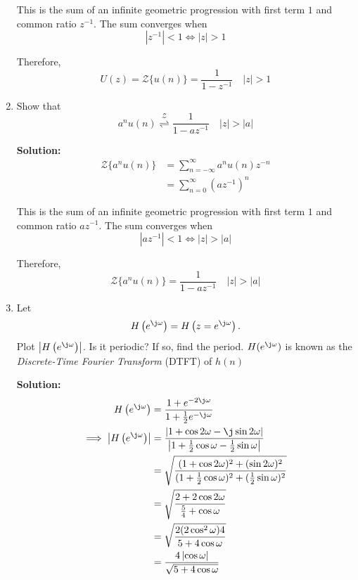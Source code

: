 \documentclass[journal,12pt,twocolumn]{IEEEtran}
\newcommand{\solution}{\noindent \textbf{Solution: }}
\providecommand{\brak}[1]{\ensuremath{\left(#1\right)}}
\providecommand{\abs}[1]{\left\vert#1\right\vert}
\providecommand{\z}[1]{{\mathcal{Z}}\{#1\}}
\providecommand{\ztrans}{\overset{\mathcal{Z}}{ \rightleftharpoons}}
\numberwithin{equation}{section}
\renewcommand\thesection{\arabic{section}}
\begin{document}
\begin{enumerate}[label=\thesection.\arabic*]
	This is the sum of an infinite geometric progression with first term $1$ and common ratio $z^{-1}$. The sum converges when
	\begin{equation}
		\abs{z^{-1}} < 1 \iff \abs{z} > 1
	\end{equation}
	
	Therefore,
	\begin{equation}
		U(z) = \z{u(n)} = \frac{1}{1 - z^{-1}} \quad \abs{z} > 1
	\end{equation}

	\item Show that 
	\begin{equation}
		\label{eq:anun}
		a^nu(n) \ztrans \frac{1}{1-az^{-1}} \quad \abs{z} > \abs{a}
	\end{equation}
	
	\solution
	\begin{align}
		\z{a^nu(n)} &= \sum _{n=-\infty }^{\infty } a^nu(n)z^{-n} \\
		&= \sum _{n=0}^{\infty } \brak{az^{-1}}^{n} 
	\end{align}
	
	This is the sum of an infinite geometric progression with first term $1$ and common ratio $az^{-1}$. The sum converges when
	\begin{equation}
		\abs{az^{-1}} < 1 \iff \abs{z} > \abs{a}
	\end{equation}
	
	Therefore,
	\begin{equation}
		\z{a^nu(n)} = \frac{1}{1-az^{-1}} \quad \abs{z} > \abs{a}
	\end{equation}
	
	\item Let
	\begin{equation}
		H\brak{e^{\j \omega}} = H\brak{z = e^{\j \omega}}.
	\end{equation}
	Plot $\abs{H\brak{e^{\j \omega}}}$.  Is it periodic? If so, find the period.  $H(e^{\j \omega})$ is known as the {\em Discrete-Time Fourier Transform} (DTFT) of $h(n)$
	
	\solution
	\begin{align}
		H\brak{e^{\j \omega}} &= \frac{1 + e^{-2\j\omega}}{1 + \frac12 e^{-\j\omega}} \\
		\implies \abs{H\brak{e^{\j \omega}}} &= \frac{\abs{1 + \cos2\omega - \j\sin2\omega}}{\abs{1 + \frac12 \cos\omega - \frac12 \sin\omega}} \\
		&= \sqrt{\frac{(1 + \cos2\omega)^2 + (\sin2\omega)^2}{(1 + \frac12 \cos\omega)^2 + (\frac12 \sin\omega)^2}} \\
		&= \sqrt{\frac{2 + 2\cos2\omega}{\frac54 + \cos\omega}} \\
		&= \sqrt{\frac{2(2\cos^2\omega)4}{5 + 4\cos\omega} } \\
		&= \frac{4\abs{\cos\omega}}{\sqrt{5 + 4\cos\omega}}
	\end{align}
	

\end{enumerate}
\end{document}
